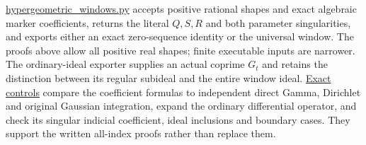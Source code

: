 \documentclass[11pt]{article}
\begin{document}
\href{hypergeometric_windows.py}{hypergeometric\_windows.py} accepts
positive rational shapes and exact algebraic marker coefficients, returns
the literal $Q,S,R$ and both parameter singularities, and exports either
an exact zero-sequence identity or the universal window. The proofs above
allow all positive real shapes; finite executable inputs are narrower.
The ordinary-ideal exporter supplies an actual coprime $G_t$ and retains
the distinction between its regular subideal and the entire window ideal.
\href{verify_hypergeometric_windows.py}{Exact controls} compare the
coefficient formulas to independent direct Gamma, Dirichlet and original
Gaussian integration, expand the ordinary differential operator, and
check its singular indicial coefficient, ideal inclusions and boundary cases.
They support the written all-index proofs rather than replace them.
\end{document}
